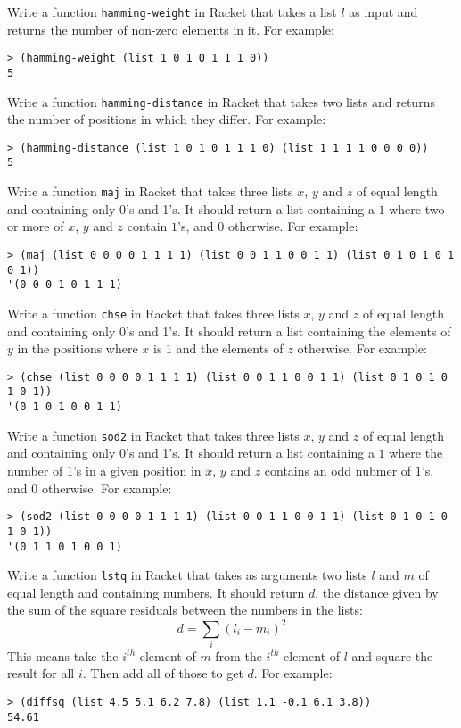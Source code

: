 \documentclass[a4paper, 12pt]{exam}
\begin{document}
\begin{questions}
\question
Write a function \texttt{hamming-weight} in Racket that takes a list $l$ as input and returns the number of non-zero elements in it.
For example:
\begin{verbatim}
> (hamming-weight (list 1 0 1 0 1 1 1 0))
5
\end{verbatim}

\question
Write a function \texttt{hamming-distance} in Racket that takes two lists and returns the number of positions in which they differ.
For example:
\begin{verbatim}
> (hamming-distance (list 1 0 1 0 1 1 1 0) (list 1 1 1 1 0 0 0 0))
5
\end{verbatim}

\question
Write a function \texttt{maj} in Racket that takes three lists $x$, $y$ and $z$ of equal length and containing only 0's and 1's.
It should return a list containing a $1$ where two or more of $x$, $y$ and $z$ contain $1$'s, and $0$ otherwise.
For example:
\begin{verbatim}
> (maj (list 0 0 0 0 1 1 1 1) (list 0 0 1 1 0 0 1 1) (list 0 1 0 1 0 1 0 1))
'(0 0 0 1 0 1 1 1)
\end{verbatim}

\question
Write a function \texttt{chse} in Racket that takes three lists $x$, $y$ and $z$ of equal length and containing only 0's and 1's.
It should return a list containing the elements of $y$ in the positions where $x$ is $1$ and the elements of $z$ otherwise.
For example:
\begin{verbatim}
> (chse (list 0 0 0 0 1 1 1 1) (list 0 0 1 1 0 0 1 1) (list 0 1 0 1 0 1 0 1))
'(0 1 0 1 0 0 1 1)
\end{verbatim}

\question
Write a function \texttt{sod2} in Racket that takes three lists $x$, $y$ and $z$ of equal length and containing only 0's and 1's.
It should return a list containing a $1$ where the number of $1$'s in a given position in $x$, $y$ and $z$ contains an odd nubmer of $1$'s, and $0$ otherwise.
For example:
\begin{verbatim}
> (sod2 (list 0 0 0 0 1 1 1 1) (list 0 0 1 1 0 0 1 1) (list 0 1 0 1 0 1 0 1))
'(0 1 1 0 1 0 0 1)
\end{verbatim}

\question
Write a function \texttt{lstq} in Racket that takes as arguments two lists $l$ and $m$ of equal length and containing numbers.
It should return $d$, the distance given by the sum of the square residuals between the numbers in the lists:
\[ d = \sum_i (l_i - m_i)^2 \]
This means take the $i^{th}$ element of $m$ from the $i^{th}$ element of $l$ and square the result for all $i$.
Then add all of those to get $d$.
For example:
\begin{verbatim}
> (diffsq (list 4.5 5.1 6.2 7.8) (list 1.1 -0.1 6.1 3.8))
54.61
\end{verbatim}



\end{questions}



\end{document}
